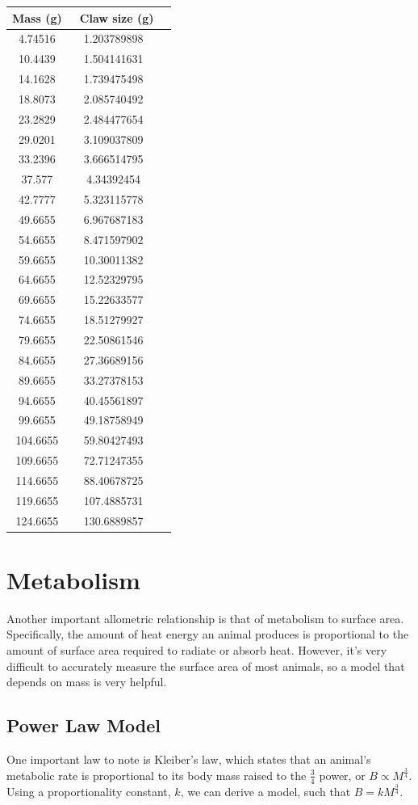 \documentclass[10pt,letterpaper]{article}
\begin{document}
			\begin{center}
				\begin{tabular}{c c c}
					Mass (g) & ~Claw size (g) \\
					\hline
					4.74516 & 1.203789898 \\
					10.4439 & 1.504141631 \\
					14.1628 & 1.739475498 \\
					18.8073 & 2.085740492 \\
					23.2829 & 2.484477654 \\
					29.0201 & 3.109037809 \\
					33.2396 & 3.666514795 \\
					37.577 & 4.34392454 \\
					42.7777 & 5.323115778 \\
					49.6655 & 6.967687183 \\
					54.6655 & 8.471597902 \\
					59.6655 & 10.30011382 \\
					64.6655 & 12.52329795 \\
					69.6655 & 15.22633577 \\
					74.6655 & 18.51279927 \\
					79.6655 & 22.50861546 \\
					84.6655 & 27.36689156 \\
					89.6655 & 33.27378153 \\
					94.6655 & 40.45561897 \\
					99.6655 & 49.18758949 \\
					104.6655 & 59.80427493 \\
					109.6655 & 72.71247355 \\
					114.6655 & 88.40678725 \\
					119.6655 & 107.4885731 \\
					124.6655 & 130.6889857 
				\end{tabular}
			\end{center}
	\section{Metabolism}
		Another important allometric relationship is that of metabolism to surface area. Specifically, the amount of heat energy an animal produces is proportional to the amount of surface area required to radiate or absorb heat. However, it's very difficult to accurately measure the surface area of most animals, so a model that depends on mass is very helpful. 
		\subsection{Power Law Model}
			One important law to note is Kleiber's law, which states that an animal's metabolic rate is proportional to its body mass raised to the $\frac 3 4$ power, or $B \propto M^{\frac 3 4}$. Using a proportionality constant, $k$, we can derive a model, such that $B = kM^{\frac 3 4}$.
\end{document}
